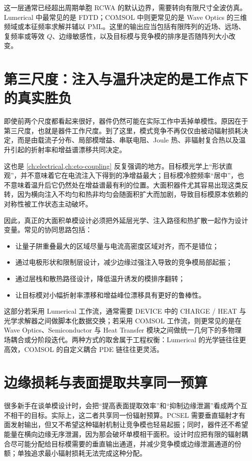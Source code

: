 这一层通常已经超出周期单胞 RCWA 的默认边界，需要转向有限尺寸全波仿真。Lumerical 中最常见的是 FDTD；COMSOL 中则更常见的是 Wave Optics 的三维频域或本征频率求解并辅以 PML。这里的输出应当包括有限阵列的近场、远场、复频率或等效 $Q$、边缘敏感性，以及目标模与竞争模的排序是否随阵列大小改变。

\section{第三尺度：注入与温升决定的是工作点下的真实胜负}
即使前两个尺度都看起来很好，器件仍然可能在实际工作中丢掉单模性。原因在于第三尺度，也就是器件工作尺度。到了这里，模式竞争不再仅仅由被动辐射损耗决定，而是由载流子分布、局部模增益、串联电阻、Joule 热、非辐射复合热以及温升引起的折射率和增益谱漂移共同决定。

这也是 \cref{ch:electrical,ch:eto-coupling} 反复强调的地方。目标模光学上“形状直观”，并不意味着它在电流注入下得到的净增益最大；目标模冷腔频率“居中”，也不意味着温升后它仍然处在增益谱最有利的位置。大面积器件尤其容易出现这类反转，因为横向注入不均匀和热非均匀会随面积扩大而加剧，导致目标模原本依赖的对称性被工作状态主动破坏。

因此，真正的大面积单模设计必须把外延层光学、注入路径和热扩散一起作为设计变量。常见的协同思路包括：
\begin{itemize}
  \item 让量子阱重叠最大的区域尽量与电流高密度区域对齐，而不是错位；
  \item 通过电极形状和限制层设计，减少边缘过强注入导致的竞争模局部起振；
  \item 通过层栈和散热路径设计，降低温升诱发的模排序翻转；
  \item 让目标模对小幅折射率漂移和增益峰位漂移具有更好的鲁棒性。
\end{itemize}

这部分若采用 Lumerical 工作流，通常需要 DEVICE 中的 CHARGE / HEAT 与光学求解器之间做脚本化数据交换；若采用 COMSOL 工作流，则更常见的是在 Wave Optics、Semiconductor 与 Heat Transfer 模块之间做统一几何下的多物理场耦合或分阶段迭代。两种方式的取舍属于工程权衡：Lumerical 的光学链往往更高效，COMSOL 的自定义耦合 PDE 链往往更灵活。

\section{边缘损耗与表面提取共享同一预算}
很多新手在谈单模设计时，会把“提高表面提取效率”和“抑制边缘泄漏”看成两个互不相干的目标。实际上，这二者共享同一份辐射预算。PCSEL 需要垂直辐射才有面发射输出，但又不希望这种辐射机制让竞争模也轻易起振；同时，器件还不希望能量在横向边缘无序泄漏，因为那会破坏单模相干面积。设计时应把有限的辐射耦合尽可能分配给目标模需要的垂直输出通道，并减少竞争模或边缘泄漏通道的份额；单独追求最小辐射损耗无法完成这种分配。

